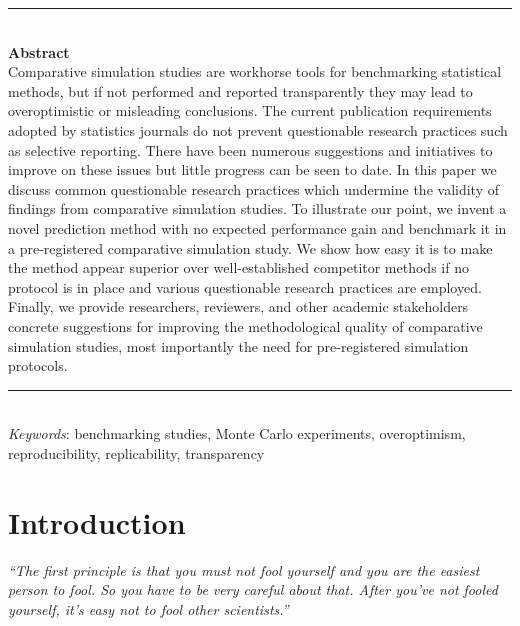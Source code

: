 \documentclass[a4paper, 11pt]{article}
\title{
  \vspace{-2em}
  \textbf{\longtitle} \\
  \subtitle
}
\author{
  \textbf{\longauthors} \\
  \affiliation \\
  \small\{samuel.pawel, lucasheinrich.kook, kelly.reeve\}@uzh.ch
}
\date{} %
\begin{document}
\maketitle

\begin{center}
\begin{minipage}{13cm}
{\small
\rule{\textwidth}{0.5pt} \\
{\centering \textbf{Abstract} \\
Comparative simulation studies are workhorse tools for benchmarking statistical methods, but if not performed and reported transparently they may lead to overoptimistic or misleading conclusions. The current publication requirements adopted by statistics journals do not prevent questionable research practices such as selective reporting. There have been numerous suggestions and initiatives to improve on these issues but little progress can be seen to date. In this paper we discuss common questionable research practices which undermine the validity of findings from comparative simulation studies. To illustrate our point, we invent a novel prediction method with no expected performance gain and benchmark it in a pre-registered comparative simulation study. We show how easy it is to make the method appear superior over well-established competitor methods if no protocol is in place and various questionable research practices are employed. Finally, we provide researchers, reviewers, and other academic stakeholders concrete suggestions for improving the methodological quality of comparative simulation studies, most importantly the need for pre-registered simulation protocols.
}
\rule{\textwidth}{0.4pt} \\
\textit{Keywords}: 
benchmarking studies, Monte Carlo experiments, overoptimism, 
reproducibility, replicability, transparency
}
\end{minipage}
\end{center}

\section{Introduction}

\begin{center}
\begin{minipage}{12cm}
\emph{``The first principle is that you must not fool yourself and you are
the easiest person to fool. So you have to be very careful about that.
After you've not fooled yourself, it's easy not to fool other scientists.''}
\end{minipage}
\end{center}
\begin{flushright}
\citet[p.~12]{Feynman1974}
\end{flushright}
\end{document}
